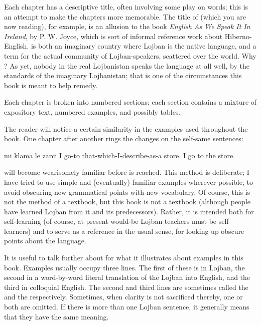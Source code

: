 Each chapter has a descriptive title, often involving some play on words; this is an attempt to make the chapters more memorable. The title of  (which you are now reading), for example, is an allusion to the book \textit{English As We Speak It In Ireland}, by P. W. Joyce, which is sort of informal reference work about Hiberno-English.  is both an imaginary country where Lojban is the native language, and a term for the actual community of Lojban-speakers, scattered over the world. Why ? As yet, nobody in the real Lojbanistan speaks the language at all well, by the standards of the imaginary Lojbanistan; that is one of the circumstances this book is meant to help remedy.



Each chapter is broken into numbered sections; each section contains a mixture of expository text, numbered examples, and possibly tables.

The reader will notice a certain similarity in the examples used throughout the book. One chapter after another rings the changes on the self-same sentences:
\begin{example}
mi klama le zarci \n
I go-to that-which-I-describe-as-a store. \n
I go to the store.
\end{example}

{\noindent}will become wearisomely familiar before  is reached. This method is deliberate; I have tried to use simple and (eventually) familiar examples wherever possible, to avoid obscuring new grammatical points with new vocabulary. Of course, this is not the method of a textbook, but this book is not a textbook (although people have learned Lojban from it and its predecessors). Rather, it is intended both for self-learning (of course, at present would-be Lojban teachers must be self-learners) and to serve as a reference in the usual sense, for looking up obscure points about the language.

It is useful to talk further about  for what it illustrates about examples in this book. Examples usually occupy three lines. The first of these is in Lojban, the second in a word-by-word literal translation of the Lojban into English, and the third in colloquial English. The second and third lines are sometimes called the  and the  respectively. Sometimes, when clarity is not sacrificed thereby, one or both are omitted. If there is more than one Lojban sentence, it generally means that they have the same meaning.

